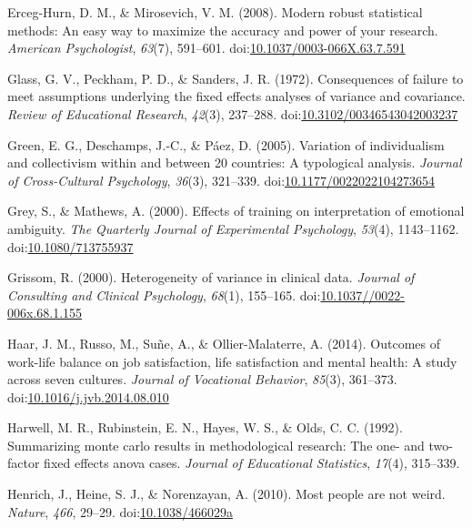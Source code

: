 \documentclass[man,floatsintext]{apa6}
\begin{document}
\leavevmode\hypertarget{ref-Erceg-Hurn_Mirosevich_2008}{}%
Erceg-Hurn, D. M., \& Mirosevich, V. M. (2008). Modern robust statistical methods: An easy way to maximize the accuracy and power of your research. \emph{American Psychologist}, \emph{63}(7), 591--601. doi:\href{https://doi.org/10.1037/0003-066X.63.7.591}{10.1037/0003-066X.63.7.591}

\leavevmode\hypertarget{ref-Glass_et_al_1972}{}%
Glass, G. V., Peckham, P. D., \& Sanders, J. R. (1972). Consequences of failure to meet assumptions underlying the fixed effects analyses of variance and covariance. \emph{Review of Educational Research}, \emph{42}(3), 237--288. doi:\href{https://doi.org/10.3102/00346543042003237}{10.3102/00346543042003237}

\leavevmode\hypertarget{ref-Green_et_al_2005}{}%
Green, E. G., Deschamps, J.-C., \& Páez, D. (2005). Variation of individualism and collectivism within and between 20 countries: A typological analysis. \emph{Journal of Cross-Cultural Psychology}, \emph{36}(3), 321--339. doi:\href{https://doi.org/10.1177/0022022104273654}{10.1177/0022022104273654}

\leavevmode\hypertarget{ref-Grey_and_Mathiews_2000}{}%
Grey, S., \& Mathews, A. (2000). Effects of training on interpretation of emotional ambiguity. \emph{The Quarterly Journal of Experimental Psychology}, \emph{53}(4), 1143--1162. doi:\href{https://doi.org/10.1080/713755937}{10.1080/713755937}

\leavevmode\hypertarget{ref-Grissom_2000}{}%
Grissom, R. (2000). Heterogeneity of variance in clinical data. \emph{Journal of Consulting and Clinical Psychology}, \emph{68}(1), 155--165. doi:\href{https://doi.org/10.1037//0022-006x.68.1.155}{10.1037//0022-006x.68.1.155}

\leavevmode\hypertarget{ref-Haar_et_al_2014}{}%
Haar, J. M., Russo, M., Suñe, A., \& Ollier-Malaterre, A. (2014). Outcomes of work-life balance on job satisfaction, life satisfaction and mental health: A study across seven cultures. \emph{Journal of Vocational Behavior}, \emph{85}(3), 361--373. doi:\href{https://doi.org/10.1016/j.jvb.2014.08.010}{10.1016/j.jvb.2014.08.010}

\leavevmode\hypertarget{ref-Harwell_et_al_1992}{}%
Harwell, M. R., Rubinstein, E. N., Hayes, W. S., \& Olds, C. C. (1992). Summarizing monte carlo results in methodological research: The one- and two-factor fixed effects anova cases. \emph{Journal of Educational Statistics}, \emph{17}(4), 315--339.

\leavevmode\hypertarget{ref-Henrich_et_al_2010}{}%
Henrich, J., Heine, S. J., \& Norenzayan, A. (2010). Most people are not weird. \emph{Nature}, \emph{466}, 29--29. doi:\href{https://doi.org/10.1038/466029a\%20}{10.1038/466029a }
\end{document}
